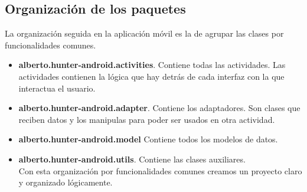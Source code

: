 	
\subsection{Organización de los paquetes}
La organización seguida en la aplicación móvil es la de agrupar las clases por funcionalidades comunes.
\begin{itemize}
\item  \textbf{alberto.hunter-android.activities}. Contiene todas las actividades. Las actividades contienen la lógica que hay detrás de cada interfaz con la que interactua el usuario.
\item \textbf{alberto.hunter-android.adapter}. Contiene los adaptadores. Son clases que reciben datos y los manipulas para poder ser usados en otra actividad.
\item \textbf{alberto.hunter-android.model} Contiene todos los modelos de datos.
\item \textbf{alberto.hunter-android.utils}. Contiene las clases auxiliares.\\ 

Con esta organización por funcionalidades comunes creamos un proyecto claro y  organizado lógicamente.

\end{itemize}



